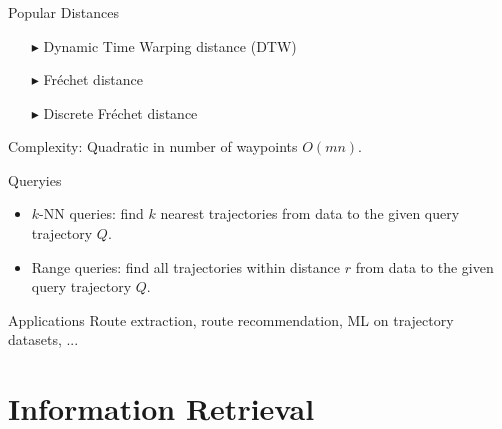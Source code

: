 \documentclass{beamer}
\begin{document}
\begin{frame}
\frametitle{}
\begin{block}{Popular Distances}
\begin{itemize}
\item [$\blacktriangleright$] Dynamic Time Warping distance (DTW)

\item [$\blacktriangleright$] Fr\'echet distance 

\item [$\blacktriangleright$] Discrete Fr\'echet distance \pause 
\end{itemize}
Complexity: {\color{orange} Quadratic in number of waypoints $O(mn)$}.
\end{block} \pause

\begin{block}{Queryies}
\begin{itemize}
\item {\color{blue} $k$-NN queries:} find $k$ nearest trajectories from data to the given query trajectory $Q$.
\item {\color{blue} Range queries:} find all trajectories within distance $r$ from data to the given query trajectory $Q$.
\end{itemize}
\end{block} \pause

\begin{block}{Applications}
{\small Route extraction, route recommendation, ML on trajectory datasets, ...}
\end{block}
\end{frame}




\section{Information Retrieval}
\end{document}
